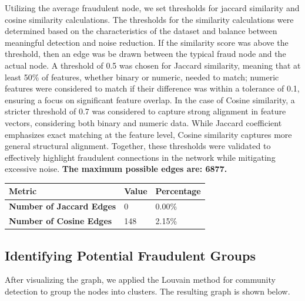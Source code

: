 \documentclass{styles/svproc}
\begin{document}
\noindent Utilizing the average fraudulent node, we set thresholds for jaccard similarity and cosine similarity calculations. The thresholds for the similarity calculations were determined based on the characteristics of the dataset and balance between meaningful detection and noise reduction. If the similarity score was above the threshold, then an edge was be drawn between the typical fraud node and the actual node. A threshold of 0.5 was chosen for Jaccard similarity, meaning that at least 50\% of features, whether binary or numeric, needed to match; numeric features were considered to match if their difference was within a tolerance of 0.1, ensuring a focus on significant feature overlap. In the case of Cosine similarity, a stricter threshold of 0.7 was considered to capture strong alignment in feature vectors, considering both binary and numeric data. While Jaccard coefficient emphasizes exact matching at the feature level, Cosine similarity captures more general structural alignment. Together, these thresholds were validated to effectively highlight fraudulent connections in the network while mitigating excessive noise. \textbf{The maximum possible edges are: 6877.}

\smallskip
\noindent
\begin{tabular}{ | m{5cm} | m{2.5cm}| m{3.2cm}|}
  \hline
  \textbf{Metric} & \textbf{Value} & \textbf{Percentage}\\ 
  \hline
  \textbf{Number of Jaccard Edges} & 0 & 0.00\%\\ 
  \hline
  \textbf{Number of Cosine Edges} & 148 & 2.15\%\\ 
  \hline
\end{tabular}

\smallskip
{}

\subsection{Identifying Potential Fraudulent Groups}
After visualizing the graph, we applied the Louvain method for community detection to group the nodes into clusters. The resulting graph is shown below.
\end{document}
